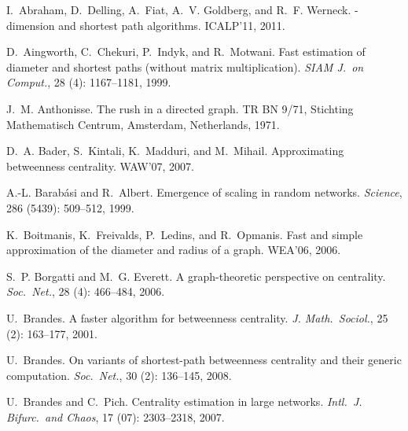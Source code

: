 \begin{thebibliography}{33}
\providecommand{\natexlab}[1]{#1}

I.~Abraham, D.~Delling, A.~Fiat, A.~V. Goldberg, and R.~F. Werneck.
-dimension and shortest path algorithms.
\newblock ICALP'11, 2011.

D.~Aingworth, C.~Chekuri, P.~Indyk, and R.~Motwani.
\newblock Fast estimation of diameter and shortest paths (without matrix
  multiplication).
\newblock \emph{SIAM J.~on Comput.}, 28 (4):
  1167--1181, 1999.

J.~M. Anthonisse.
\newblock The rush in a directed graph.
\newblock TR BN 9/71, Stichting Mathematisch Centrum, Amsterdam,
  Netherlands, 1971.

D.~A. Bader, S.~Kintali, K.~Madduri, and M.~Mihail.
\newblock Approximating betweenness centrality.
\newblock WAW'07, 2007.

A.-L. Barab{\'a}si and R.~Albert.
\newblock Emergence of scaling in random networks.
\newblock \emph{Science}, 286 (5439): 509--512, 1999.

K.~Boitmanis, K.~Freivalds, P.~Ledins, and R.~Opmanis.
\newblock Fast and simple approximation of the diameter and radius of a graph.
\newblock WEA'06, 2006.

S.~P. Borgatti and M.~G. Everett.
\newblock A graph-theoretic perspective on centrality.
\newblock \emph{Soc.~Net.}, 28 (4): 466--484, 2006.

U.~Brandes.
\newblock A faster algorithm for betweenness centrality.
\newblock \emph{J. Math.~Sociol.}, 25
  (2): 163--177, 2001.

U.~Brandes.
\newblock On variants of shortest-path betweenness centrality and their generic
  computation.
\newblock \emph{Soc.~Net.}, 30 (2): 136--145, 2008.

U.~Brandes and C.~Pich.
\newblock Centrality estimation in large networks.
\newblock \emph{Intl.~J. Bifurc.~and Chaos}, 17
  (07): 2303--2318, 2007.


\end{thebibliography}

